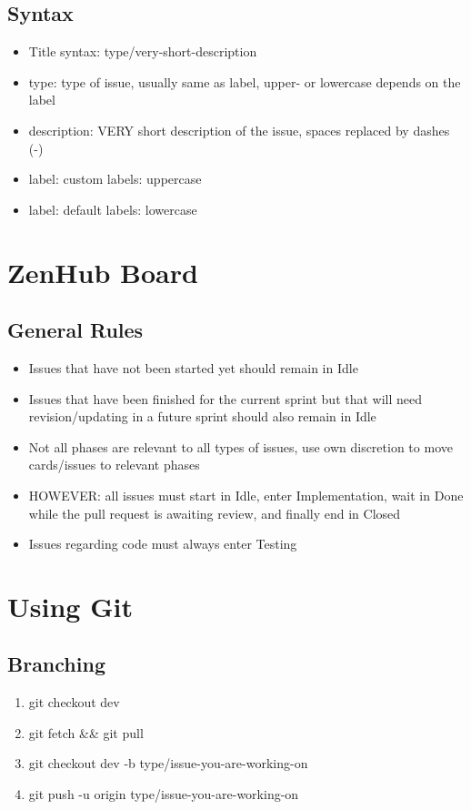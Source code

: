 \documentclass{article}
\begin{document}
		\subsection{Syntax}
			\begin{itemize}
				\item Title syntax: type/very-short-description
				\item type: type of issue, usually same as label, upper- or lowercase depends on the label
				\item description: VERY short description of the issue, spaces replaced by dashes (-)
				\item label: custom labels: uppercase
				\item label: default labels: lowercase
			\end{itemize}
			
	\section{ZenHub Board}
		\subsection{General Rules}
			\begin{itemize}
				\item Issues that have not been started yet should remain in Idle
				\item Issues that have been finished for the current sprint but that will need revision/updating in a future sprint should also remain in Idle
				\item Not all phases are relevant to all types of issues, use own discretion to move cards/issues to relevant phases
				\item HOWEVER: all issues must start in Idle, enter Implementation, wait in Done while the pull request is awaiting review, and finally end in Closed
				\item Issues regarding code must always enter Testing
			\end{itemize}
			
	\section{Using Git}
		\subsection{Branching}
			\begin{enumerate}
				\item git checkout dev
				\item git fetch \&\& git pull
				\item git checkout dev -b type/issue-you-are-working-on
				\item git push -u origin type/issue-you-are-working-on
			\end{enumerate}
\end{document}
